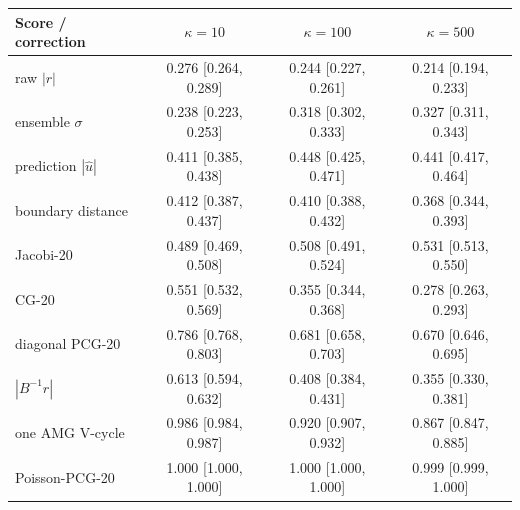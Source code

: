 \begin{tabular}{lccc}
\toprule
Score / correction & $\kappa=10$ & $\kappa=100$ & $\kappa=500$ \\
\midrule
raw $|r|$ & 0.276 [0.264, 0.289] & 0.244 [0.227, 0.261] & 0.214 [0.194, 0.233] \\
ensemble $\sigma$ & 0.238 [0.223, 0.253] & 0.318 [0.302, 0.333] & 0.327 [0.311, 0.343] \\
prediction $|\hat u|$ & 0.411 [0.385, 0.438] & 0.448 [0.425, 0.471] & 0.441 [0.417, 0.464] \\
boundary distance & 0.412 [0.387, 0.437] & 0.410 [0.388, 0.432] & 0.368 [0.344, 0.393] \\
Jacobi-20 & 0.489 [0.469, 0.508] & 0.508 [0.491, 0.524] & 0.531 [0.513, 0.550] \\
CG-20 & 0.551 [0.532, 0.569] & 0.355 [0.344, 0.368] & 0.278 [0.263, 0.293] \\
diagonal PCG-20 & 0.786 [0.768, 0.803] & 0.681 [0.658, 0.703] & 0.670 [0.646, 0.695] \\
$|B^{-1}r|$ & 0.613 [0.594, 0.632] & 0.408 [0.384, 0.431] & 0.355 [0.330, 0.381] \\
one AMG V-cycle & 0.986 [0.984, 0.987] & 0.920 [0.907, 0.932] & 0.867 [0.847, 0.885] \\
Poisson-PCG-20 & 1.000 [1.000, 1.000] & 1.000 [1.000, 1.000] & 0.999 [0.999, 1.000] \\
\bottomrule
\end{tabular}
